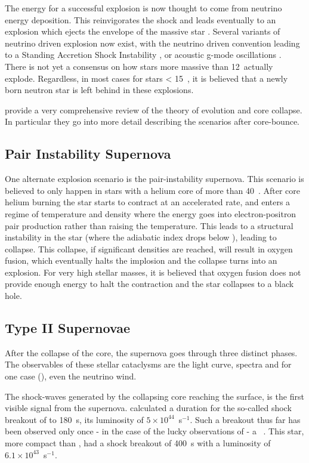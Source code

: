 The energy for a successful explosion is now thought to come from neutrino energy deposition. This reinvigorates the shock and leads eventually to an explosion which ejects the envelope of the massive star \citep{1994ApJ...435..339H}. Several variants of neutrino driven explosion now exist, with the neutrino driven convention leading to a Standing Accretion Shock Instability \citep[SASI;][]{2006ApJ...642..401B}, or acoustic g-mode oscillations \citep{2007ApJ...655..416B} . There is not yet a consensus on how stars more massive than 12~\msun actually explode. Regardless, in most cases for stars < 15~\msun, it is believed that a newly born neutron star is left behind in these explosions. 

 \citet{2002RvMP...74.1015W} provide a very comprehensive review of the theory of evolution and core collapse. In particular they go into more detail describing the scenarios after core-bounce.

\subsection{Pair Instability Supernova}
One alternate explosion scenario is the pair-instability supernova. This scenario is believed to only happen in stars with a helium core of more than 40~\msun. After core helium burning the star starts to contract at an accelerated rate, and enters a regime of temperature and density where the energy goes into electron-positron pair production rather than raising the temperature. This leads to a structural instability in the star (where the adiabatic index drops below ), leading to collapse. This collapse, if significant densities are reached, will result in oxygen fusion, which eventually halts the implosion and the collapse turns into an explosion. For very high stellar masses, it is believed that oxygen fusion does not provide enough energy to halt the contraction and the star collapses to a black hole.


\subsection{Type II Supernovae}
After the collapse of the core, the supernova goes through three distinct phases. The observables of these stellar cataclysms are the light curve, spectra and for one case (), even the neutrino wind.

The shock-waves generated by the collapsing core reaching the surface, is the first visible signal from the supernova.  \cite{1992ApJ...393..742E} calculated a duration for the so-called shock breakout of  to 180~s, its  luminosity of $5\times10^{44}$\erg~s$^{-1}$. 
Such a breakout thus far has been observed only once - in the case of the lucky observations of  - a \snibc\ \citep{2008Natur.453..469S}. This star, more compact than , had a shock breakout of 400~s with a luminosity of $6.1\times10^{43}$\erg~s$^{-1}$.

